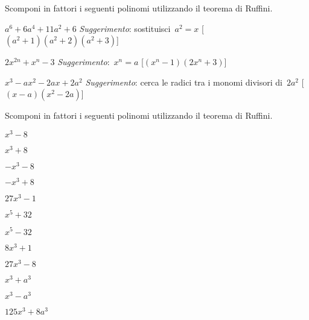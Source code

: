 \begin{esercizio}[\Ast]
\label{ese:17.15}
Scomponi in fattori i seguenti polinomi utilizzando il teorema di Ruffini.
 \begin{enumeratea}
\item $a^{6}+6a^{4}+11a^{2}+6$ \emph{Suggerimento}: sostituisci~$a^{2}=x$
  \hfill [$(a^{2}+1)(a^{2}+2)(a^{2}+3)$]
\item $2x^{2n}+x^{n}-3$ \emph{Suggerimento}:~$x^{n}=a$
  \hfill [$(x^{n}-1)(2x^{n}+3)$]
\item $x^{3}-ax^{2}-2ax+2a^{2}$ \emph{Suggerimento}: cerca le radici tra i
  monomi divisori di~$2a^{2}$
  \hfill [$(x-a)\left(x^{2}-2a\right)$]
 \end{enumeratea}
\end{esercizio}

\begin{esercizio}
\label{ese:17.11}
Scomponi in fattori i seguenti polinomi utilizzando il teorema di Ruffini.
\begin{multicols}{3}
 \begin{enumeratea}
\item $x^{3}-8$
\item $x^{3}+8$
\item $-x^{3}-8$
\item $-x^{3}+8$
\item $27x^{3}-1$
\item $x^{5}+32$
\item $x^{5}-32$
\item $8x^{3}+1$
\item $27x^{3}-8$
\item $x^{3}+a^{3}$
\item $x^{3}-a^{3}$
\item $125x^{3}+8a^{3}$
 \end{enumeratea}
\end{multicols}
\end{esercizio}

\subsubsection*{}

